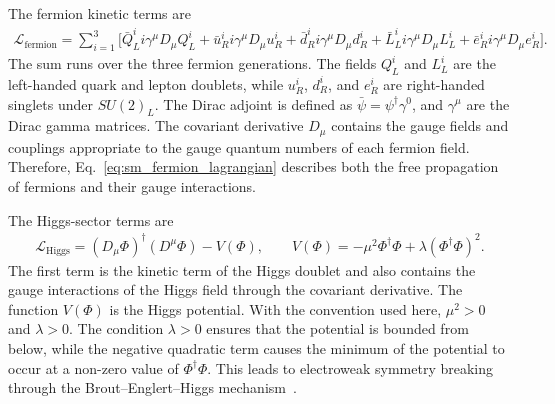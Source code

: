 The fermion kinetic terms are
\begin{align}
    \mathcal{L}_{\mathrm{fermion}}
    =
    \sum_{i=1}^{3}
    \bigg[
        \bar{Q}_{L}^{i} i\gamma^{\mu}D_{\mu}Q_{L}^{i}
        +
        \bar{u}_{R}^{i} i\gamma^{\mu}D_{\mu}u_{R}^{i}
        +
        \bar{d}_{R}^{i} i\gamma^{\mu}D_{\mu}d_{R}^{i}
        +
        \bar{L}_{L}^{i} i\gamma^{\mu}D_{\mu}L_{L}^{i}
        +
        \bar{e}_{R}^{i} i\gamma^{\mu}D_{\mu}e_{R}^{i}
    \bigg].
    \label{eq:sm_fermion_lagrangian}
\end{align}
The sum runs over the three fermion generations. 
The fields $Q_{L}^{i}$ and $L_{L}^{i}$ are the left-handed quark and lepton doublets, while $u_{R}^{i}$, $d_{R}^{i}$, and $e_{R}^{i}$ are right-handed singlets under $SU(2)_{L}$. 
The Dirac adjoint is defined as $\bar{\psi}=\psi^{\dagger}\gamma^{0}$, and $\gamma^{\mu}$ are the Dirac gamma matrices. 
The covariant derivative $D_{\mu}$ contains the gauge fields and couplings appropriate to the gauge quantum numbers of each fermion field. 
Therefore, Eq.~\eqref{eq:sm_fermion_lagrangian} describes both the free propagation of fermions and their gauge interactions.

The Higgs-sector terms are
\begin{align}
    \mathcal{L}_{\mathrm{Higgs}}
    =
    (D_{\mu}\Phi)^{\dagger}(D^{\mu}\Phi)
    -
    V(\Phi),
    \qquad
    V(\Phi)
    =
    -
    \mu^{2}\Phi^{\dagger}\Phi
    +
    \lambda(\Phi^{\dagger}\Phi)^{2}.
    \label{eq:sm_higgs_lagrangian}
\end{align}
The first term is the kinetic term of the Higgs doublet and also contains the gauge interactions of the Higgs field through the covariant derivative. 
The function $V(\Phi)$ is the Higgs potential. 
With the convention used here, $\mu^{2}>0$ and $\lambda>0$. 
The condition $\lambda>0$ ensures that the potential is bounded from below, while the negative quadratic term causes the minimum of the potential to occur at a non-zero value of $\Phi^{\dagger}\Phi$. 
This leads to electroweak symmetry breaking through the Brout--Englert--Higgs mechanism~\cite{Englert1964,Higgs1964,Guralnik1964}.

